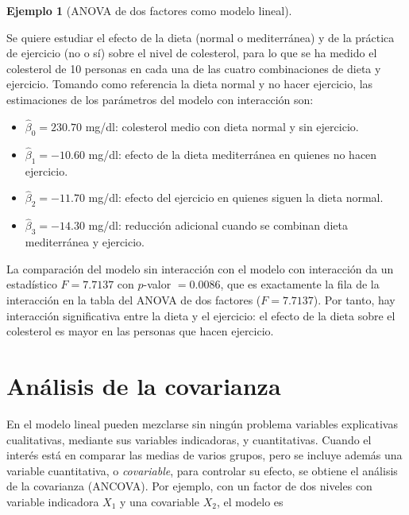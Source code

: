 \documentclass[
  spanish,
  a4paper,
]{scrreport}
\providecommand{\tightlist}{%
  \setlength{\itemsep}{0pt}\setlength{\parskip}{0pt}}
\theoremstyle{plain}
\theoremstyle{definition}
\newtheorem{example}{Ejemplo}[chapter]
\theoremstyle{definition}
\theoremstyle{remark}
\begin{document}
\begin{example}[ANOVA de dos factores como modelo
lineal]\protect\hypertarget{exm-anova2-modelo-lineal}{}\label{exm-anova2-modelo-lineal}

Se quiere estudiar el efecto de la dieta (normal o mediterránea) y de la
práctica de ejercicio (no o sí) sobre el nivel de colesterol, para lo
que se ha medido el colesterol de 10 personas en cada una de las cuatro
combinaciones de dieta y ejercicio. Tomando como referencia la dieta
normal y no hacer ejercicio, las estimaciones de los parámetros del
modelo con interacción son:

\begin{itemize}
\tightlist
\item
  \(\hat\beta_0=230.70\) mg/dl: colesterol medio con dieta normal y sin
  ejercicio.
\item
  \(\hat\beta_1=-10.60\) mg/dl: efecto de la dieta mediterránea en
  quienes no hacen ejercicio.
\item
  \(\hat\beta_2=-11.70\) mg/dl: efecto del ejercicio en quienes siguen
  la dieta normal.
\item
  \(\hat\beta_3=-14.30\) mg/dl: reducción adicional cuando se combinan
  dieta mediterránea y ejercicio.
\end{itemize}

La comparación del modelo sin interacción con el modelo con interacción
da un estadístico \(F=7.7137\) con \(p\)-valor \(= 0.0086\), que es
exactamente la fila de la interacción en la tabla del ANOVA de dos
factores (\(F=7.7137\)). Por tanto, hay interacción significativa entre
la dieta y el ejercicio: el efecto de la dieta sobre el colesterol es
mayor en las personas que hacen ejercicio.

\end{example}

\section{Análisis de la covarianza}\label{anuxe1lisis-de-la-covarianza}

En el modelo lineal pueden mezclarse sin ningún problema variables
explicativas cualitativas, mediante sus variables indicadoras, y
cuantitativas. Cuando el interés está en comparar las medias de varios
grupos, pero se incluye además una variable cuantitativa, o
\emph{covariable}, para controlar su efecto, se obtiene el análisis de
la covarianza (ANCOVA). Por ejemplo, con un factor de dos niveles con
variable indicadora \(X_1\) y una covariable \(X_2\), el modelo es
\end{document}
